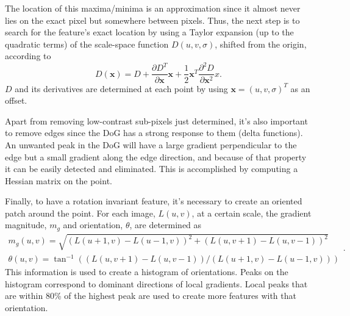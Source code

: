 The location of this maxima/minima is an approximation since it almost never lies on the exact pixel but somewhere between pixels. Thus, the next step is to search for the feature's exact location by using a Taylor expansion (up to the quadratic terms) of the scale-space function $D(u,v,\sigma)$, shifted from the origin, according to 
\begin{equation}
\label{sec2:eq:subpixel}
D ( \mathbf{x} ) = D + \frac { \partial D ^ { T } } { \partial \mathbf{x} } \mathbf{x}  + \frac { 1 } { 2 } \mathbf{x} ^ { T } \frac { \partial ^ { 2 } D } { \partial \mathbf{x}^ { 2 } } x.
\end{equation}
$D$ and its derivatives are determined at each point by using $\mathbf{x} = (u, v, \sigma)^T$ as an offset.

Apart from removing low-contrast sub-pixels just determined, it's also important to remove edges since the DoG has a strong response to them (delta functions). An unwanted peak in the DoG will have a large gradient perpendicular to the edge but a small gradient along the edge direction, and because of that property it can be easily detected and eliminated. This is accomplished by computing a Hessian matrix on the point.

Finally, to have a rotation invariant feature, it's necessary to create an oriented patch around the point. For each image, $L(u, v)$, at a certain scale, the gradient magnitude, $m_g$ and orientation, $\theta$, are determined as 
\begin{equation}
\label{sec2:eq:descriptor}
\begin{array} { l } { m_g ( u , v ) = \sqrt { ( L ( u + 1 , v ) - L ( u - 1 , v ) ) ^ { 2 } + ( L ( u , v + 1 ) - L ( u , v - 1 ) ) ^ { 2 } } } \\ { \theta ( u , v ) = \tan ^ { - 1 } ( ( L ( u , v + 1 ) - L ( u , v - 1 ) ) / ( L ( u + 1 , v ) - L ( u - 1 , v ) ) ) } \end{array}.
\end{equation}
This information is used to create a histogram of orientations. Peaks on the histogram correspond to dominant directions of local gradients. Local peaks that are within 80\% of the highest peak are used to create more features with that orientation.

